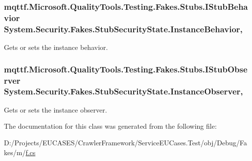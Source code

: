 \hypertarget{class_system_1_1_security_1_1_fakes_1_1_stub_security_state_a1a3177982d216be7cc69879b50554b8f}{
\subsubsection[{Instance\-Behavior}]{\setlength{\rightskip}{0pt plus 5cm}mqttf.\-Microsoft.\-Quality\-Tools.\-Testing.\-Fakes.\-Stubs.\-I\-Stub\-Behavior System.\-Security.\-Fakes.\-Stub\-Security\-State.\-Instance\-Behavior\hspace{0.3cm}{\ttfamily [get]}, {\ttfamily [set]}}}\label{class_system_1_1_security_1_1_fakes_1_1_stub_security_state_a1a3177982d216be7cc69879b50554b8f}


Gets or sets the instance behavior.

\hypertarget{class_system_1_1_security_1_1_fakes_1_1_stub_security_state_ae4212dd10e051b2daf819cddd96fcc74}{
\subsubsection[{Instance\-Observer}]{\setlength{\rightskip}{0pt plus 5cm}mqttf.\-Microsoft.\-Quality\-Tools.\-Testing.\-Fakes.\-Stubs.\-I\-Stub\-Observer System.\-Security.\-Fakes.\-Stub\-Security\-State.\-Instance\-Observer\hspace{0.3cm}{\ttfamily [get]}, {\ttfamily [set]}}}\label{class_system_1_1_security_1_1_fakes_1_1_stub_security_state_ae4212dd10e051b2daf819cddd96fcc74}


Gets or sets the instance observer.



The documentation for this class was generated from the following file\-:\begin{DoxyCompactItemize}
\item 
D\-:/\-Projects/\-E\-U\-C\-A\-S\-E\-S/\-Crawler\-Framework/\-Service\-E\-U\-Cases.\-Test/obj/\-Debug/\-Fakes/m/\hyperlink{m_2f_8cs}{f.\-cs}\end{DoxyCompactItemize}
